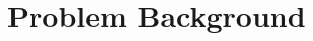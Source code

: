\documentclass{article} %
\theoremstyle{plain}
\theoremstyle{definition}
\begin{document}

\vspace{-1.5mm}
\section{Problem Background}\label{sec:background}
\vspace{-1.5mm}

\end{document}
